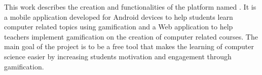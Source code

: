 This work describes the creation and functionalities of the platform named \appName. It is a mobile application developed for Android devices to help students learn computer related topics using gamification and a Web application to help teachers implement gamification on the creation of computer related courses. The main goal of the project is to be a free tool that makes the learning of computer science easier by increasing students motivation and engagement through gamification.